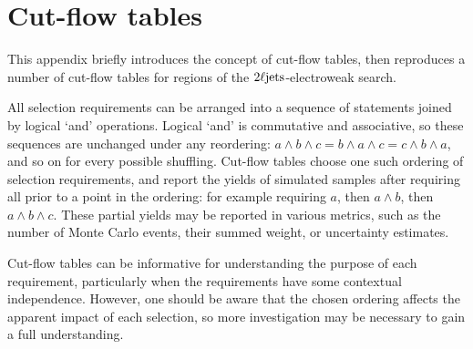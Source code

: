 \chapter{Cut-flow tables}
\label{app:2ljets_cut_flows}

This appendix briefly introduces the concept of cut-flow tables, then
reproduces a number of cut-flow tables for regions of the
$2\ell\mathrm{jets}$-electroweak search.

All selection requirements can be arranged into a sequence of statements joined
by logical `and' operations.
Logical `and' is commutative and associative, so these sequences are unchanged
under any reordering:
$a \land b \land c = b \land a \land c = c \land b \land a$, and so on for
every possible shuffling.
Cut-flow tables choose one such ordering of selection requirements, and report
the yields of simulated samples after requiring all prior to a point in the
ordering: for example requiring
$a$, then $a \land b$, then $a \land b \land c$.
These partial yields may be reported in various metrics, such as the number
of Monte Carlo events, their summed weight, or uncertainty estimates.

Cut-flow tables can be informative for understanding the purpose of each
requirement, particularly when the requirements have some contextual
independence.
However, one should be aware that the chosen ordering affects the apparent
impact of each selection, so more investigation may be necessary to gain a full
understanding.

